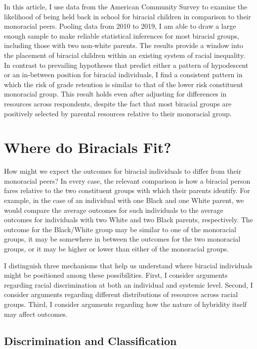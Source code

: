\documentclass[
  letterpaper,
  DIV=11,
  numbers=noendperiod]{scrartcl}
\begin{document}
In this article, I use data from the American Community Survey to
examine the likelihood of being held back in school for biracial
children in comparison to their monoracial peers. Pooling data from 2010
to 2019, I am able to draw a large enough sample to make reliable
statistical inferences for most biracial groups, including those with
two non-white parents. The results provide a window into the placement
of biracial children within an existing system of racial inequality. In
contrast to prevailing hypotheses that predict either a pattern of
hypodescent or an in-between position for biracial individuals, I find a
consistent pattern in which the risk of grade retention is similar to
that of the lower risk constituent monoracial group. This result holds
even after adjusting for differences in resources across respondents,
despite the fact that most biracial groups are positively selected by
parental resources relative to their monoracial group.

\hypertarget{where-do-biracials-fit}{%
\section{Where do Biracials Fit?}\label{where-do-biracials-fit}}

How might we expect the outcomes for biracial individuals to differ from
their monoracial peers? In every case, the relevant comparison is how a
biracial person fares relative to the two constituent groups with which
their parents identify. For example, in the case of an individual with
one Black and one White parent, we would compare the average outcomes
for such individuals to the average outcomes for individuals with two
White and two Black parents, respectively. The outcome for the
Black/White group may be similar to one of the monoracial groups, it may
be somewhere in between the outcomes for the two monoracial groups, or
it may be higher or lower than either of the monoracial groups.

I distinguish three mechanisms that help us understand where biracial
individuals might be positioned among these possibilities. First, I
consider arguments regarding racial discrimination at both an individual
and systemic level. Second, I consider arguments regarding different
distributions of resources across racial groups. Third, I consider
arguments regarding how the nature of hybridity itself may affect
outcomes.

\hypertarget{discrimination-and-classification}{%
\subsection{Discrimination and
Classification}\label{discrimination-and-classification}}
\end{document}
